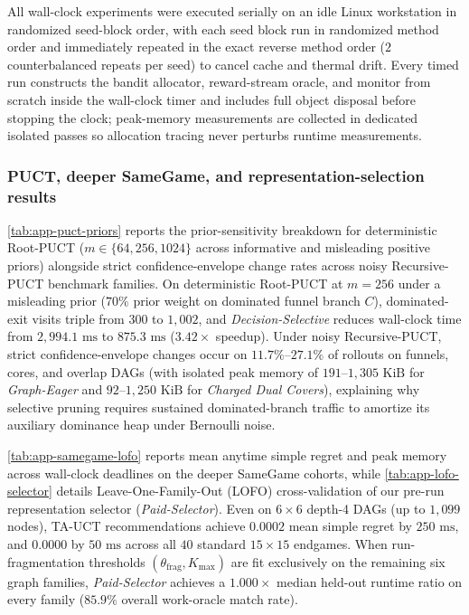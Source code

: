 \documentclass{article}
\theoremstyle{plain}
\theoremstyle{definition}
\begin{document}
All wall-clock experiments were executed serially on an idle Linux workstation in randomized seed-block order, with each seed block run in randomized method order and immediately repeated in the exact reverse method order ($2$ counterbalanced repeats per seed) to cancel cache and thermal drift. Every timed run constructs the bandit allocator, reward-stream oracle, and monitor from scratch inside the wall-clock timer and includes full object disposal before stopping the clock; peak-memory measurements are collected in dedicated isolated passes so allocation tracing never perturbs runtime measurements.

\subsubsection{PUCT, deeper SameGame, and representation-selection results}

\cref{tab:app-puct-priors} reports the prior-sensitivity breakdown for deterministic Root-PUCT ($m \in \{64, 256, 1024\}$ across informative and misleading positive priors) alongside strict confidence-envelope change rates across noisy Recursive-PUCT benchmark families. On deterministic Root-PUCT at $m=256$ under a misleading prior ($70\%$ prior weight on dominated funnel branch $C$), dominated-exit visits triple from $300$ to $1{,}002$, and \emph{Decision-Selective} reduces wall-clock time from $2{,}994.1\text{ ms}$ to $875.3\text{ ms}$ ($3.42\times$ speedup). Under noisy Recursive-PUCT, strict confidence-envelope changes occur on $11.7\%$--$27.1\%$ of rollouts on funnels, cores, and overlap DAGs (with isolated peak memory of $191$--$1{,}305\text{ KiB}$ for \emph{Graph-Eager} and $92$--$1{,}250\text{ KiB}$ for \emph{Charged Dual Covers}), explaining why selective pruning requires sustained dominated-branch traffic to amortize its auxiliary dominance heap under Bernoulli noise.

\cref{tab:app-samegame-lofo} reports mean anytime simple regret and peak memory across wall-clock deadlines on the deeper SameGame cohorts, while \cref{tab:app-lofo-selector} details Leave-One-Family-Out (LOFO) cross-validation of our pre-run representation selector (\emph{Paid-Selector}). Even on $6\times 6$ depth-4 DAGs (up to $1{,}099$ nodes), TA-UCT recommendations achieve $0.0002$ mean simple regret by $250\text{ ms}$, and $0.0000$ by $50\text{ ms}$ across all $40$ standard $15\times 15$ endgames. When run-fragmentation thresholds $(\theta_{\mathrm{frag}}, K_{\max})$ are fit exclusively on the remaining six graph families, \emph{Paid-Selector} achieves a $1.000\times$ median held-out runtime ratio on every family ($85.9\%$ overall work-oracle match rate).
\end{document}
